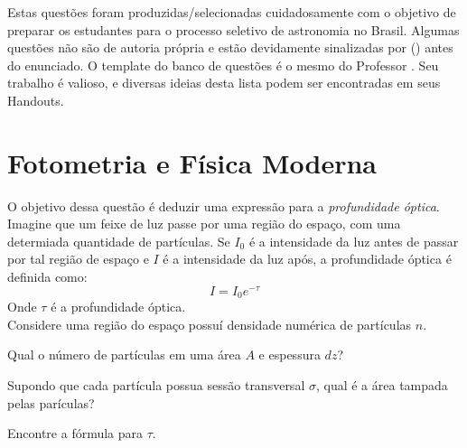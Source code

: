\documentclass[11pt]{article}
\begin{document}

Estas questões foram produzidas/selecionadas cuidadosamente com o objetivo de preparar os estudantes para o processo seletivo de astronomia no Brasil. Algumas questões não são de autoria própria e estão devidamente sinalizadas por () antes do enunciado. O template do banco de questões é o mesmo do Professor . Seu trabalho é valioso, e diversas ideias desta lista podem ser encontradas em seus Handouts.




\section{Fotometria e Física Moderna}

\begin{pproblem}
    O objetivo dessa questão é deduzir uma expressão para a \textit{profundidade óptica}. Imagine que um feixe de luz passe por uma região do espaço, com uma determiada quantidade de partículas. Se \(I_0\) é a intensidade da luz antes de passar por tal região de espaço e \(I\) é a intensidade da luz após, a profundidade óptica é definida como:
    \[I = I_0e^{-\tau}\]
    Onde \(\tau\) é a profundidade óptica.
    \\
    Considere uma região do espaço possuí densidade numérica de partículas \(n\).
    \begin{alternativas}
        \item Qual o número de partículas em uma área \(A\) e espessura \(dz\)?
        \item Supondo que cada partícula possua sessão transversal \(\sigma\), qual é a área tampada pelas parículas?
        \item Encontre a fórmula para \(\tau\). 
    \end{alternativas}

\end{pproblem}
\end{document}

